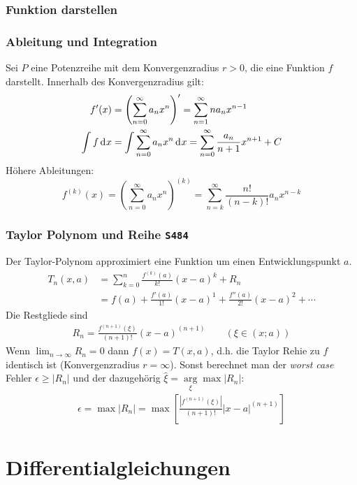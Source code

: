 \documentclass[margin=small, twocolumn]{hsrzf}
\numberwithin{equation}{subsection}
\newcommand{\brpage}[1]{\textcolor{red!70!black}{\small\texttt{S#1}}}
\begin{document}
\subsubsection{Funktion darstellen}

\subsubsection{Ableitung und Integration}
Sei \(P\) eine Potenzreihe mit dem Konvergenzradius \(r > 0\), die eine Funktion \(f\) darstellt. Innerhalb des Konvergenzradius gilt:
\begin{align*}
    f'(x) &= \left(\sum_{n=0}^\infty a_n x^n \right)' 
        = \sum_{n=1}^\infty n a_n x^{n-1} \\
    \int f \,\mathrm{d}^{} x &= \int \sum_{n=0}^\infty a_n x^n \,\mathrm{d}^{} x
        = \sum_{n=0}^\infty \frac{a_n}{n+1} x^{n+1} + C
\end{align*}
H\"ohere Ableitungen:
\[
    f^{(k)}(x) = \left(\sum_{n=0}^\infty a_n x^n \right)^{(k)} 
    = \sum_{n=k}^\infty \frac{n!}{(n-k)!} a_n x^{n-k}
\]

\subsubsection{Taylor Polynom und Reihe \brpage{484}}
Der Taylor-Polynom approximiert eine Funktion um einen Entwicklungspunkt \(a\).
\begin{align*}
  T_n(x, a) &= \sum_{k=0}^n\frac{f^{(k)}(a)}{k!}(x-a)^k + R_n\\
  &= f(a) + \frac{f'(a)}{1!}(x-a)^1 + \frac{f''(a)}{2!}(x-a)^2 + \cdots
\end{align*}
Die Restgliede sind
\begin{align*}
  R_n = \frac{f^{(n+1)}(\xi)}{(n+1)!} (x-a)^{(n+1)} \qquad (\xi \in (x;a))
\end{align*}
Wenn \(\lim_{n\to\infty}R_n = 0\) dann \(f(x) = T(x,a)\), d.h. die Taylor Rehie zu \(f\) identisch ist (Konvergenzradius \(r = \infty\)). Sonst berechnet man der \emph{worst case} Fehler \(\epsilon \geq |R_n|\) und der dazugeh\"orig \(\hat{\xi} = \underset{\xi}{\arg}\max|R_n|\):
\begin{align*}
  \epsilon
  = \max |R_n|
  = \max \left[\frac{|f^{(n+1)}(\xi)|}{(n+1)!} |x-a|^{(n+1)}\right]
\end{align*}


\section{Differentialgleichungen}
\end{document}
